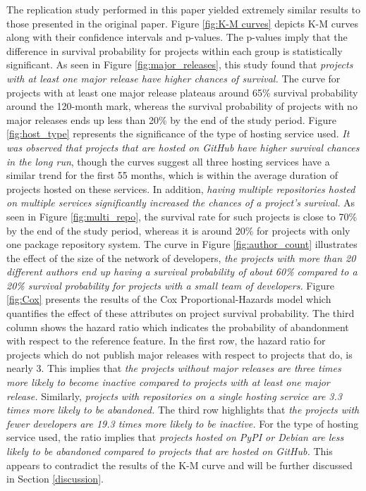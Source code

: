 \documentclass[sigconf]{acmart}
\begin{document}
The replication study performed in this paper yielded extremely similar results to those presented in the original paper. 
Figure \ref{fig:K-M curves} depicts K-M curves along with their confidence intervals and p-values. 
The p-values imply that the difference in survival probability for projects within each group is statistically significant.
As seen in Figure \ref{fig:major_releases}, this study found that \emph{projects with at least one major release have higher chances of survival.} 
The curve for projects with at least one major release plateaus around 65\% survival probability around the 120-month mark, whereas the survival probability of projects with no major releases ends up less than 20\% by the end of the study period. 
Figure \ref{fig:host_type} represents the significance of the type of hosting service used. \emph{It was observed that projects that are hosted on GitHub have higher survival chances in the long run}, though the curves suggest all three hosting services have a similar trend for the first 55 months, which is within the average duration of projects hosted on these services.
In addition, \emph{having multiple repositories hosted on multiple services significantly increased the chances of a project's survival.}
As seen in Figure \ref{fig:multi_repo}, the survival rate for such projects is close to 70\% by the end of the study period, whereas it is around 20\% for projects with only one package repository system. 
The curve in Figure \ref{fig:author_count} illustrates the effect of the size of the network of developers, \emph{the projects with more than 20 different authors end up having a survival probability of about 60\% compared to a 20\% survival probability for projects with a small team of developers.
}
Figure \ref{fig:Cox} presents the results of the Cox Proportional-Hazards model which quantifies the effect of these attributes on project survival probability. 
The third column shows the hazard ratio which indicates the probability of abandonment with respect to the reference feature.
In the first row, the hazard ratio for projects which do not publish major releases with respect to projects that do, is nearly 3. 
This implies that \emph{the projects without major releases are three times more likely to become inactive compared to projects with at least one major release.} 
Similarly, \emph{projects with repositories on a single hosting service are 3.3 times more likely to be abandoned.}
The third row highlights that \emph{the projects with fewer developers are 19.3 times more likely to be inactive.}
For the type of hosting service used, the ratio implies that \emph{projects hosted on PyPI or Debian are less likely to be abandoned compared to projects that are hosted on GitHub.} 
This appears to contradict the results of the K-M curve and will be further discussed in Section \ref{discussion}.
\end{document}

